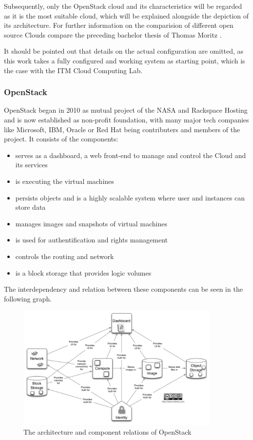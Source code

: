Subsequently, only the OpenStack cloud and its characteristics will be regarded as it is the most suitable cloud, which will be explained alongside the depiction of its architecture. For further information on the comparision of different open source Clouds compare the preceding bachelor thesis of Thomas Moritz \cite{thomas2013cloud}.

It should be pointed out that details on the actual configuration are omitted, as this work takes a fully configured and working system as starting point, which is the case with the ITM Cloud Computing Lab.

\subsubsection{OpenStack}
\label{subsubsec:openstack}

OpenStack began in 2010 as mutual project of the NASA and Rackspace Hosting and is now established as non-profit foundation, with many major tech companies like Microsoft, IBM, Oracle or Red Hat being contributers and members of the project. It consists of the components:

\begin{itemize}
	\item{ serves as a dashboard, a web front-end to manage and control the Cloud and its services}
	\item{ is executing the virtual machines}
	\item{ persists objects and is a highly scalable system where user and instances can store data}
	\item{ manages images and snapshots of virtual machines}
	\item{ is used for authentification and rights management}
	\item{ controls the routing and network}
	\item{ is a block storage that provides logic volumes}
\end{itemize}

The interdependency and relation between these components can be seen in the following graph.

\begin{figure}[h!]
	\centering
		\includegraphics[width=0.9\textwidth]{images/openstack-architecture.png}
	\caption{The architecture and component relations of OpenStack \cite{website:wikimedia-openstack-conceptual}}
\end{figure}

